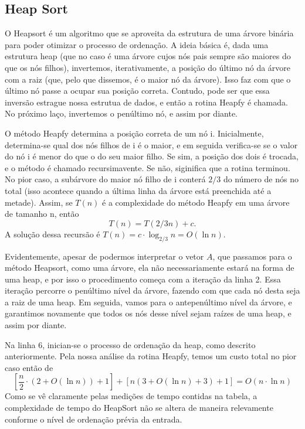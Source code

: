 \documentclass{article}
\begin{document}
\subsection{Heap Sort}
O Heapsort é um algoritmo que se aproveita da estrutura de uma árvore binária para poder otimizar o processo de ordenação. A ideia básica é, dada uma estrutura heap (que no caso é uma árvore cujos nós pais sempre são maiores do que os nós filhos), invertemos, iterativamente, a posição do último nó da árvore com a raiz (que, pelo que dissemos, é o maior nó da árvore). Isso faz com que o último nó passe a ocupar sua posição correta. Contudo, pode ser que essa inversão estrague nossa estrutua de dados, e então a rotina Heapfy é chamada. No próximo laço, invertemos o penúltimo nó, e assim por diante.\par
%
O método Heapfy determina a posição correta de um nó i. Inicialmente, determina-se qual dos nós filhos de i é o maior, e em seguida verifica-se se o valor do nó i é menor do que o do seu maior filho. Se sim, a posição dos dois é trocada, e o método é chamado recursimavente. Se não, siginifica que a rotina terminou. No pior caso, a subárvore do maior nó filho de i conterá $2/3$ do número de nós no total (isso acontece quando a última linha da árvore está preenchida até a metade). Assim, se $T(n)$ é a complexidade do método Heapfy em uma árvore de tamanho n, então \[T(n) = T(2/3n) + c.\]
A solução dessa recursão é $T(n) = c \cdot \log_{2/3}n = O(\ln n).$\par
Evidentemente, apesar de podermos interpretar o vetor $A$, que passamos para o método Heapsort, como uma árvore, ela não necessariamente estará na forma de uma heap, e por isso o procedimento começa com a iteração da linha 2. Essa iteração percorre o penúltimo nível da árvore, fazendo com que cada nó desta seja a raiz de uma heap. Em seguida, vamos para o antepenúltimo nível da árvore, e garantimos novamente que todos os nós desse nível sejam raízes de uma heap, e assim por diante.\par
Na linha 6, inician-se o processo de ordenação da heap, como descrito anteriormente. Pela nossa análise da rotina Heapfy, temos um custo total no pior caso então de \[\left[\frac{n}{2}\cdot(2+O(\ln n)) + 1\right]+ \left[n(3 + O(\ln n) + 3) + 1\right] = O(n\cdot \ln n)\]
Como se vê claramente pelas medições de tempo contidas na tabela, a complexidade de tempo do HeapSort não se altera de maneira relevamente conforme o nível de ordenação prévia da entrada.
%
\end{document}
